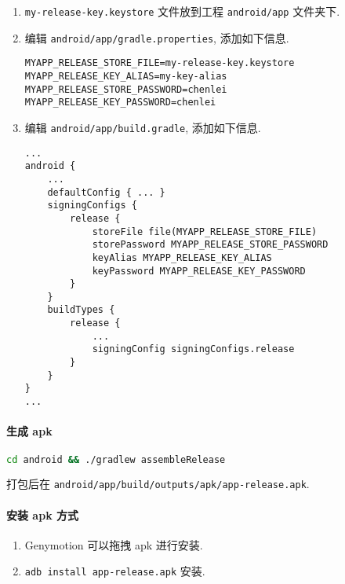 \begin{enumerate}
\def\labelenumi{\arabic{enumi}.}
\item
  \lstinline!my-release-key.keystore! 文件放到工程
  \lstinline!android/app! 文件夹下.
\item
  编辑 \lstinline!android/app/gradle.properties!, 添加如下信息.

\begin{lstlisting}
MYAPP_RELEASE_STORE_FILE=my-release-key.keystore
MYAPP_RELEASE_KEY_ALIAS=my-key-alias
MYAPP_RELEASE_STORE_PASSWORD=chenlei
MYAPP_RELEASE_KEY_PASSWORD=chenlei
\end{lstlisting}
\item
  编辑 \lstinline!android/app/build.gradle!, 添加如下信息.

\begin{lstlisting}
...
android {
    ...
    defaultConfig { ... }
    signingConfigs {
        release {
            storeFile file(MYAPP_RELEASE_STORE_FILE)
            storePassword MYAPP_RELEASE_STORE_PASSWORD
            keyAlias MYAPP_RELEASE_KEY_ALIAS
            keyPassword MYAPP_RELEASE_KEY_PASSWORD
        }
    }
    buildTypes {
        release {
            ...
            signingConfig signingConfigs.release
        }
    }
}
...
\end{lstlisting}
\end{enumerate}

\paragraph{生成 apk}\label{ux751fux6210-apk}

\begin{lstlisting}[language=bash]
cd android && ./gradlew assembleRelease
\end{lstlisting}

打包后在 \lstinline!android/app/build/outputs/apk/app-release.apk!.

\paragraph{安装 apk 方式}\label{ux5b89ux88c5-apk-ux65b9ux5f0f}

\begin{enumerate}
\def\labelenumi{\arabic{enumi}.}
\tightlist
\item
  Genymotion 可以拖拽 apk 进行安装.
\item
  \lstinline!adb install app-release.apk! 安装.
\end{enumerate}


